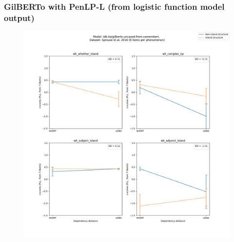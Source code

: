 \subsubsection{GilBERTo with PenLP-L (from logistic function model output)}
\begin{figure}[h]
	\centering
	\includegraphics[width=1\textwidth]{images/Chapter1/Sprouse_wh_idb-ita_gilberto-uncased-from-camembert_PLL-zscores-likert-2022-07-11.png} 
\end{figure}

\clearpage
